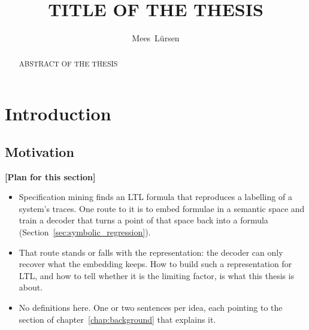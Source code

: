 \documentclass[titlepage,a4paper,11pt]{report}
\newenvironment{RSplan}{\par\medskip\color{orange!85!black}\noindent\textbf{[Plan for this section]}\par}{\par\medskip}
\begin{document}
\title{TITLE OF THE THESIS}
\author{Mees~Lürsen}
\maketitle

\begin{abstract}
  ABSTRACT OF THE THESIS

\end{abstract}


\clearpage

\tableofcontents

\chapter{Introduction}\label{chap:introduction}

    \section{Motivation}\label{sec:intro_motivation}
    \begin{RSplan}
    \begin{itemize}
        \item Specification mining finds an LTL formula that reproduces a labelling of a system's traces. One route to it is to embed formulae in a semantic space and train a decoder that turns a point of that space back into a formula (Section~\ref{sec:symbolic_regression}).
        \item That route stands or falls with the representation: the decoder can only recover what the embedding keeps. How to build such a representation for LTL, and how to tell whether it is the limiting factor, is what this thesis is about.
        \item No definitions here. One or two sentences per idea, each pointing to the section of chapter~\ref{chap:background} that explains it.
    \end{itemize}
    \end{RSplan}
\end{document}
